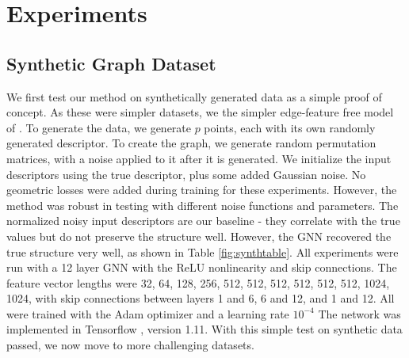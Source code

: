 \documentclass{article} %
\begin{document}
\section{Experiments}


\subsection{Synthetic Graph Dataset}
We first test our method on synthetically generated data as a simple proof of concept.
As these were simpler datasets, we the simpler edge-feature free model of \cite{kipf2017semi}.
To generate the data, we generate $p$ points, each with its own randomly generated descriptor.
To create the graph, we generate random permutation matrices, with a noise applied to it after it is generated.
We initialize the input descriptors using the true descriptor, plus some added Gaussian noise.
No geometric losses were added during training for these experiments.
However, the method was robust in testing with different noise functions and parameters.
The normalized noisy input descriptors are our baseline - they correlate with the true values but do not preserve the structure well.
However, the GNN recovered the true structure very well, as shown in Table \ref{fig:synthtable}.
All experiments were run with a 12 layer GNN with the ReLU nonlinearity and skip connections.
The feature vector lengths were 32, 64, 128, 256, 512, 512, 512, 512, 512, 512, 1024, 1024, with skip connections between layers 1 and 6, 6 and 12, and 1 and 12.
All were trained with the Adam optimizer \cite{kingma2014adam} and a learning rate $10^{-4}$
The network was implemented in Tensorflow \cite{tensorflow2015}, version 1.11.
With this simple test on synthetic data passed, we now move to more challenging datasets.
\end{document}
